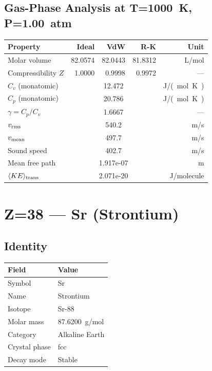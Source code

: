 \documentclass[11pt,a4paper]{article}
\begin{document}
\subsection{Gas-Phase Analysis at T=\SI{1000}{K}, P=\SI{1.00}{atm}}
\begin{tabular}{lrrrr}
  \toprule
  Property & Ideal & VdW & R-K & Unit \\
  \midrule
  Molar volume & 82.0574 & 82.0443 & 81.8312 & \si{L/mol} \\
  Compressibility $Z$ & 1.0000 & 0.9998 & 0.9972 & --- \\
  \midrule
  $C_v$ (monatomic) & \multicolumn{3}{c}{12.472} & \si{J/(mol.K)} \\
  $C_p$ (monatomic) & \multicolumn{3}{c}{20.786} & \si{J/(mol.K)} \\
  $\gamma = C_p/C_v$ & \multicolumn{3}{c}{1.6667} & --- \\
  $v_{\rm rms}$ & \multicolumn{3}{c}{540.2} & \si{m/s} \\
  $v_{\rm mean}$ & \multicolumn{3}{c}{497.7} & \si{m/s} \\
  Sound speed & \multicolumn{3}{c}{402.7} & \si{m/s} \\
  Mean free path & \multicolumn{3}{c}{1.917e-07} & \si{m} \\
  $\langle KE \rangle_{\rm trans}$ & \multicolumn{3}{c}{2.071e-20} & \si{J/molecule} \\
  \bottomrule
\end{tabular}

\newpage

\section{Z=38 --- Sr (Strontium)}
\label{sec:Z38}

\subsection{Identity}
\begin{tabular}{ll}
  \toprule
  Field & Value \\
  \midrule
  Symbol & Sr \\
  Name & Strontium \\
  Isotope & Sr-88 \\
  Molar mass & \SI{87.6200}{g/mol} \\
  Category & Alkaline Earth \\
  Crystal phase & fcc \\
  Decay mode & Stable \\
  \bottomrule
\end{tabular}
\end{document}

